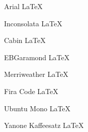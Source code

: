 \documentclass[12pt]{article}
\begin{document}
\setmainfont{Arial} Arial \LaTeX

\setmainfont{Inconsolata} Inconsolata \LaTeX

\setmainfont{Cabin-Medium} Cabin \LaTeX

\setmainfont{EB Garamond} EBGaramond \LaTeX

\setmainfont{Merriweather} Merriweather \LaTeX

\setmainfont{Fira Code} Fira Code \LaTeX

\setmainfont{Ubuntu Mono} Ubuntu Mono \LaTeX

\setmainfont{Yanone Kaffeesatz} Yanone Kaffeesatz \LaTeX
\end{document}
